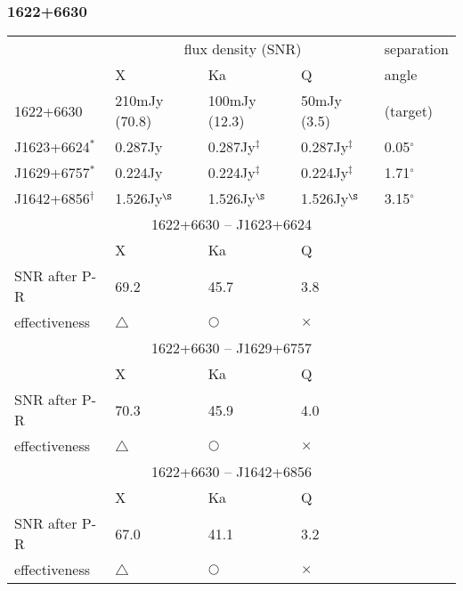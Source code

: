 \subsubsection{
  1622+6630
}
\begin{tabular}{p{30mm}|p{30mm}|p{30mm}|p{30mm}|p{20mm}}
\hline
                 & \multicolumn{3}{c|}{flux density (SNR)}
                 & separation \\
\cline{2-4}
                 & X
                 & Ka
                 & Q
                 & angle \\
\hline
1622+6630        & 210mJy (70.8)
                 & 100mJy (12.3)
                 &  50mJy (3.5)
                 & (target)   \\
\hline
J1623+6624$^*$   & 0.287Jy
                 & 0.287Jy$^\ddag$
                 & 0.287Jy$^\ddag$
                 & 0.05$^\circ$ \\
\hline
J1629+6757$^*$   & 0.224Jy
                 & 0.224Jy$^\ddag$
                 & 0.224Jy$^\ddag$
                 & 1.71$^\circ$ \\
\hline
J1642+6856$^\dag$& 1.526Jy$^\S$
                 & 1.526Jy$^\S$
                 & 1.526Jy$^\S$
                 & 3.15$^\circ$ \\
\hline
\hline
\multicolumn{5}{c}{1622+6630 -- J1623+6624}         \\
\hline
              &  X          & Ka         & \multicolumn{2}{l}{Q}       \\
\hline
SNR after P-R & 69.2        & 45.7       & \multicolumn{2}{l}{3.8}     \\
\hline
effectiveness & $\triangle$ & $\bigcirc$ & \multicolumn{2}{l}{$\times$}\\
\hline
\hline
\multicolumn{5}{c}{1622+6630 -- J1629+6757}         \\
\hline
              &  X          & Ka         & \multicolumn{2}{l}{Q}       \\
\hline
SNR after P-R & 70.3        & 45.9       & \multicolumn{2}{l}{4.0}     \\
\hline
effectiveness & $\triangle$ & $\bigcirc$ & \multicolumn{2}{l}{$\times$}\\
\hline
\hline
\multicolumn{5}{c}{1622+6630 -- J1642+6856}         \\
\hline
              &  X          & Ka         & \multicolumn{2}{l}{Q}       \\
\hline
SNR after P-R & 67.0        & 41.1       & \multicolumn{2}{l}{3.2}     \\
\hline
effectiveness & $\triangle$ & $\bigcirc$ & \multicolumn{2}{l}{$\times$}\\
\hline
\end{tabular}

